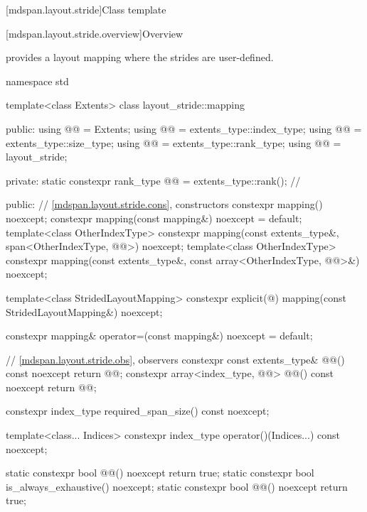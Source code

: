 [mdspan.layout.stride]{Class template }

[mdspan.layout.stride.overview]{Overview}

\pnum
{} provides a layout mapping
where the strides are user-defined.

%
\begin{codeblock}
namespace std {
  template<class Extents>
  class layout_stride::mapping {
  public:
    using @@ = Extents;
    using @@ = extents_type::index_type;
    using @@ = extents_type::size_type;
    using @@ = extents_type::rank_type;
    using @@ = layout_stride;

  private:
    static constexpr rank_type @@ = extents_type::rank();    // \expos

  public:
    // \ref{mdspan.layout.stride.cons}, constructors
    constexpr mapping() noexcept;
    constexpr mapping(const mapping&) noexcept = default;
    template<class OtherIndexType>
      constexpr mapping(const extents_type&, span<OtherIndexType, @@>) noexcept;
    template<class OtherIndexType>
      constexpr mapping(const extents_type&, const array<OtherIndexType, @@>&) noexcept;

    template<class StridedLayoutMapping>
      constexpr explicit(@\seebelow@) mapping(const StridedLayoutMapping&) noexcept;

    constexpr mapping& operator=(const mapping&) noexcept = default;

    // \ref{mdspan.layout.stride.obs}, observers
    constexpr const extents_type& @@() const noexcept { return @@; }
    constexpr array<index_type, @@> @@() const noexcept { return @@; }

    constexpr index_type required_span_size() const noexcept;

    template<class... Indices>
      constexpr index_type operator()(Indices...) const noexcept;

    static constexpr bool @@() noexcept { return true; }
    static constexpr bool is_always_exhaustive() noexcept;
    static constexpr bool @@() noexcept { return true; }

}}
\end{codeblock}
